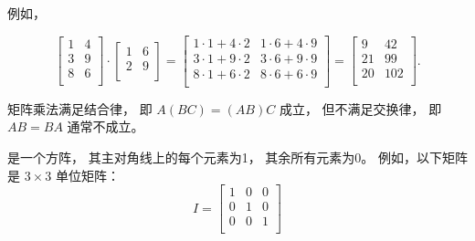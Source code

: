 例如，

\[
 \begin{bmatrix}
  1 & 4 \\
  3 & 9 \\
  8 & 6 \\
 \end{bmatrix}
\cdot
 \begin{bmatrix}
  1 & 6 \\
  2 & 9 \\
 \end{bmatrix}
=
 \begin{bmatrix}
  1 \cdot 1 + 4 \cdot 2 & 1 \cdot 6 + 4 \cdot 9 \\
  3 \cdot 1 + 9 \cdot 2 & 3 \cdot 6 + 9 \cdot 9 \\
  8 \cdot 1 + 6 \cdot 2 & 8 \cdot 6 + 6 \cdot 9 \\
 \end{bmatrix}
=
 \begin{bmatrix}
  9 & 42 \\
  21 & 99 \\
  20 & 102 \\
 \end{bmatrix}.
\]

矩阵乘法满足结合律，
即 $A(BC)=(AB)C$ 成立，
但不满足交换律，
即 $AB = BA$ 通常不成立。


是一个方阵，
其主对角线上的每个元素为1，
其余所有元素为0。
例如，以下矩阵
是 $3 \times 3$ 单位矩阵：
\[
 I = \begin{bmatrix}
  1 & 0 & 0 \\
  0 & 1 & 0 \\
  0 & 0 & 1 \\
 \end{bmatrix}
\]

